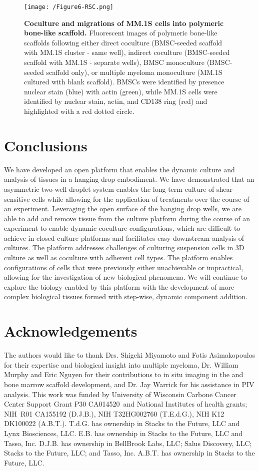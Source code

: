 \begin{figure}[ht] %
\centering
\texttt{[image: /Figure6-RSC.png]}
\caption[\textbf{Coculture and migrations of MM.1S cells into polymeric bone-like scaffold.}]{\textbf{Coculture and migrations of MM.1S cells into polymeric bone-like scaffold.} Fluorescent images of polymeric bone-like scaffolds following either direct coculture (BMSC-seeded scaffold with MM.1S cluster - same well), indirect coculture (BMSC-seeded scaffold with MM.1S - separate wells), BMSC monoculture (BMSC-seeded scaffold only), or multiple myeloma monoculture (MM.1S cultured with blank scaffold). BMSCs were identified by presence nuclear stain (blue) with actin (green), while MM.1S cells were identified by nuclear stain, actin, and CD138 ring (red) and highlighted with a red dotted circle.}
\label{figure:Fig6}
\end{figure}


\section{Conclusions}
We have developed an open platform that enables the dynamic culture and analysis of tissues in a hanging drop embodiment. We have demonstrated that an asymmetric two-well droplet system enables the long-term culture of shear-sensitive cells while allowing for the application of treatments over the course of an experiment. Leveraging the open surface of the hanging drop wells, we are able to add and remove tissue from the culture platform during the course of an experiment to enable dynamic coculture configurations, which are difficult to achieve in closed culture platforms and facilitates easy downstream analysis of cultures. The platform addresses challenges of culturing suspension cells in 3D culture as well as coculture with adherent cell types. The platform enables configurations of cells that were previously either unachievable or impractical, allowing for the investigation of new biological phenomena. We will continue to explore the biology enabled by this platform with the development of more complex biological tissues formed with step-wise, dynamic component addition. 

\section{Acknowledgements}
The authors would like to thank Drs. Shigeki Miyamoto and Fotis Asimakopoulos for their expertise and biological insight into multiple myeloma, Dr. William Murphy and Eric Nguyen for their contributions to in situ imaging in the  and bone marrow scaffold development, and Dr. Jay Warrick for his assistance in PIV analysis. This work was funded by University of Wisconsin Carbone Cancer Center Support Grant P30 CA014520 and National Institutes of health grants; NIH R01 CA155192 (D.J.B.), NIH T32HG002760 (T.E.d.G.), NIH K12 DK100022 (A.B.T.). T.d.G. has ownership in Stacks to the Future, LLC and Lynx Biosciences, LLC. E.B. has ownership in Stacks to the Future, LLC and Tasso, Inc.   D.J.B. has ownership in BellBrook Labs, LLC; Salus Discovery, LLC; Stacks to the Future, LLC; and Tasso, Inc. A.B.T. has ownership in Stacks to the Future, LLC.
